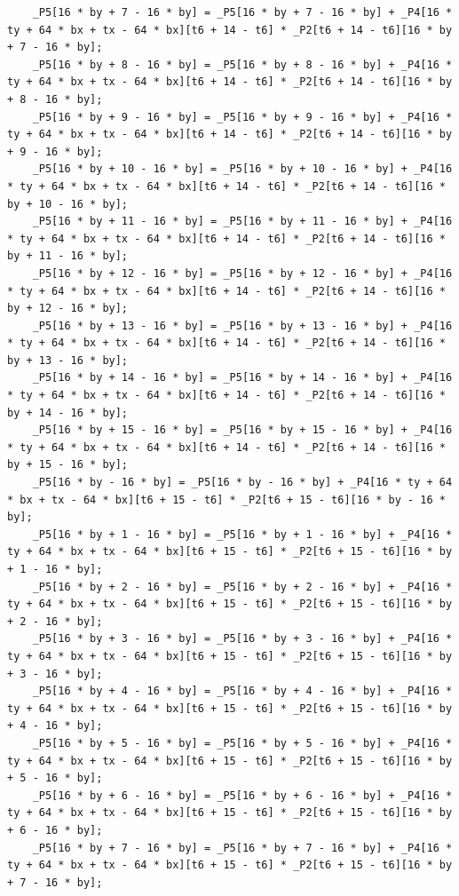 \documentclass[msthesis,justified,copyright,final,numbers,sort&compress,
gsmodern,amstex,natbib]{uothesis}
\begin{document}
\begin{lstlisting}
    _P5[16 * by + 7 - 16 * by] = _P5[16 * by + 7 - 16 * by] + _P4[16 * ty + 64 * bx + tx - 64 * bx][t6 + 14 - t6] * _P2[t6 + 14 - t6][16 * by + 7 - 16 * by];
    _P5[16 * by + 8 - 16 * by] = _P5[16 * by + 8 - 16 * by] + _P4[16 * ty + 64 * bx + tx - 64 * bx][t6 + 14 - t6] * _P2[t6 + 14 - t6][16 * by + 8 - 16 * by];
    _P5[16 * by + 9 - 16 * by] = _P5[16 * by + 9 - 16 * by] + _P4[16 * ty + 64 * bx + tx - 64 * bx][t6 + 14 - t6] * _P2[t6 + 14 - t6][16 * by + 9 - 16 * by];
    _P5[16 * by + 10 - 16 * by] = _P5[16 * by + 10 - 16 * by] + _P4[16 * ty + 64 * bx + tx - 64 * bx][t6 + 14 - t6] * _P2[t6 + 14 - t6][16 * by + 10 - 16 * by];
    _P5[16 * by + 11 - 16 * by] = _P5[16 * by + 11 - 16 * by] + _P4[16 * ty + 64 * bx + tx - 64 * bx][t6 + 14 - t6] * _P2[t6 + 14 - t6][16 * by + 11 - 16 * by];
    _P5[16 * by + 12 - 16 * by] = _P5[16 * by + 12 - 16 * by] + _P4[16 * ty + 64 * bx + tx - 64 * bx][t6 + 14 - t6] * _P2[t6 + 14 - t6][16 * by + 12 - 16 * by];
    _P5[16 * by + 13 - 16 * by] = _P5[16 * by + 13 - 16 * by] + _P4[16 * ty + 64 * bx + tx - 64 * bx][t6 + 14 - t6] * _P2[t6 + 14 - t6][16 * by + 13 - 16 * by];
    _P5[16 * by + 14 - 16 * by] = _P5[16 * by + 14 - 16 * by] + _P4[16 * ty + 64 * bx + tx - 64 * bx][t6 + 14 - t6] * _P2[t6 + 14 - t6][16 * by + 14 - 16 * by];
    _P5[16 * by + 15 - 16 * by] = _P5[16 * by + 15 - 16 * by] + _P4[16 * ty + 64 * bx + tx - 64 * bx][t6 + 14 - t6] * _P2[t6 + 14 - t6][16 * by + 15 - 16 * by];
    _P5[16 * by - 16 * by] = _P5[16 * by - 16 * by] + _P4[16 * ty + 64 * bx + tx - 64 * bx][t6 + 15 - t6] * _P2[t6 + 15 - t6][16 * by - 16 * by];
    _P5[16 * by + 1 - 16 * by] = _P5[16 * by + 1 - 16 * by] + _P4[16 * ty + 64 * bx + tx - 64 * bx][t6 + 15 - t6] * _P2[t6 + 15 - t6][16 * by + 1 - 16 * by];
    _P5[16 * by + 2 - 16 * by] = _P5[16 * by + 2 - 16 * by] + _P4[16 * ty + 64 * bx + tx - 64 * bx][t6 + 15 - t6] * _P2[t6 + 15 - t6][16 * by + 2 - 16 * by];
    _P5[16 * by + 3 - 16 * by] = _P5[16 * by + 3 - 16 * by] + _P4[16 * ty + 64 * bx + tx - 64 * bx][t6 + 15 - t6] * _P2[t6 + 15 - t6][16 * by + 3 - 16 * by];
    _P5[16 * by + 4 - 16 * by] = _P5[16 * by + 4 - 16 * by] + _P4[16 * ty + 64 * bx + tx - 64 * bx][t6 + 15 - t6] * _P2[t6 + 15 - t6][16 * by + 4 - 16 * by];
    _P5[16 * by + 5 - 16 * by] = _P5[16 * by + 5 - 16 * by] + _P4[16 * ty + 64 * bx + tx - 64 * bx][t6 + 15 - t6] * _P2[t6 + 15 - t6][16 * by + 5 - 16 * by];
    _P5[16 * by + 6 - 16 * by] = _P5[16 * by + 6 - 16 * by] + _P4[16 * ty + 64 * bx + tx - 64 * bx][t6 + 15 - t6] * _P2[t6 + 15 - t6][16 * by + 6 - 16 * by];
    _P5[16 * by + 7 - 16 * by] = _P5[16 * by + 7 - 16 * by] + _P4[16 * ty + 64 * bx + tx - 64 * bx][t6 + 15 - t6] * _P2[t6 + 15 - t6][16 * by + 7 - 16 * by];

\end{lstlisting}
\end{document}
